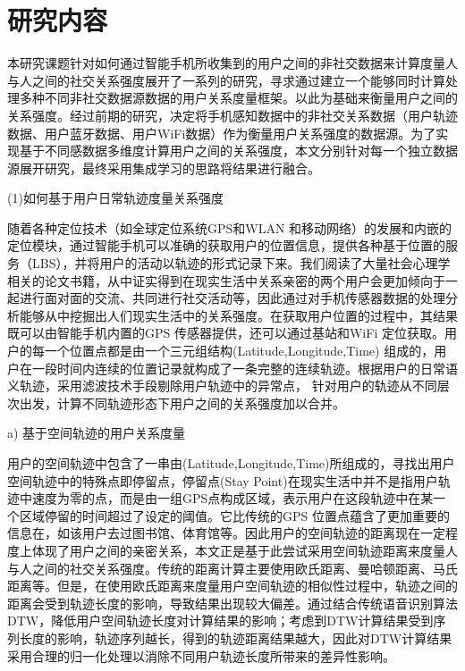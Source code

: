 \section{研究内容}
本研究课题针对如何通过智能手机所收集到的用户之间的非社交数据来计算度量人与人之间的社交关系强度展开了一系列的研究，寻求通过建立一个能够同时计算处理多种不同非社交数据源数据的用户关系度量框架。以此为基础来衡量用户之间的关系强度。经过前期的研究，决定将手机感知数据中的非社交关系数据（用户轨迹数据、用户蓝牙数据、用户WiFi数据）作为衡量用户关系强度的数据源。为了实现基于不同感数据多维度计算用户之间的关系强度，本文分别针对每一个独立数据源展开研究，最终采用集成学习的思路将结果进行融合。
\par (1)如何基于用户日常轨迹度量关系强度
\par 随着各种定位技术（如全球定位系统GPS和WLAN 和移动网络）的发展和内嵌的定位模块，通过智能手机可以准确的获取用户的位置信息，提供各种基于位置的服务（LBS），并将用户的活动以轨迹的形式记录下来。我们阅读了大量社会心理学相关的论文书籍，从中证实得到在现实生活中关系亲密的两个用户会更加倾向于一起进行面对面的交流、共同进行社交活动等，因此通过对手机传感器数据的处理分析能够从中挖掘出人们现实生活中的关系强度。在获取用户位置的过程中，其结果既可以由智能手机内置的GPS 传感器提供，还可以通过基站和WiFi 定位获取。用户的每一个位置点都是由一个三元组结构(Latitude,Longitude,Time) 组成的，用户在一段时间内连续的位置记录就构成了一条完整的连续轨迹。根据用户的日常语义轨迹，采用滤波技术手段剔除用户轨迹中的异常点，%
针对用户的轨迹从不同层次出发，计算不同轨迹形态下用户之间的关系强度加以合并。
\par a) 基于空间轨迹的用户关系度量
\par  用户的空间轨迹中包含了一串由(Latitude,Longitude,Time)所组成的，寻找出用户空间轨迹中的特殊点即停留点，停留点(Stay Point)在现实生活中并不是指用户轨迹中速度为零的点，而是由一组GPS点构成区域，表示用户在这段轨迹中在某一个区域停留的时间超过了设定的阈值。它比传统的GPS 位置点蕴含了更加重要的信息在，如该用户去过图书馆、体育馆等。因此用户的空间轨迹的距离现在一定程度上体现了用户之间的亲密关系，本文正是基于此尝试采用空间轨迹距离来度量人与人之间的社交关系强度。传统的距离计算主要使用欧氏距离、曼哈顿距离、马氏距离等。但是，在使用欧氏距离来度量用户空间轨迹的相似性过程中，轨迹之间的距离会受到轨迹长度的影响，导致结果出现较大偏差。通过结合传统语音识别算法DTW，降低用户空间轨迹长度对计算结果的影响；考虑到DTW计算结果受到序列长度的影响，轨迹序列越长，得到的轨迹距离结果越大，因此对DTW计算结果采用合理的归一化处理以消除不同用户轨迹长度所带来的差异性影响。
